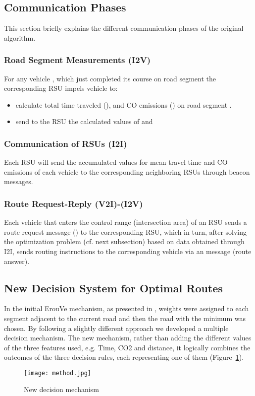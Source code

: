 \documentclass[conference]{IEEEtran}
\begin{document}
\subsection{Communication Phases}
This section briefly explains the different communication phases of the original algorithm. 

\subsubsection{{\bf Road Segment Measurements (I2V)}}
For any vehicle , which just completed its course on road segment   the corresponding RSU impels vehicle  to:

\begin{itemize}
\item calculate total time traveled (), and CO emissions () on road segment . \item send to the RSU the calculated values of   and 
\end{itemize}


\subsubsection{{\bf Communication of RSUs (I2I)}}
Each RSU will send the accumulated values for mean travel time and CO emissions of each vehicle to the corresponding neighboring RSUs through beacon messages.


\subsubsection{{\bf Route Request-Reply (V2I)-(I2V)}}
Each vehicle  that enters the control range (intersection area) of an RSU sends a route request message () to the corresponding RSU,
which in turn, after solving the optimization problem (cf. next subsection) based on data obtained through I2I,  sends routing instructions
 to the corresponding vehicle via an  message  (route answer).


\subsection{New Decision System for Optimal Routes}
In the initial ErouVe mechanism, as presented in \cite{maglaras2013exploiting}, weights were assigned to each segment adjacent to the current road and then 
the road with the minimum was chosen.
By following  a slightly different approach we developed a multiple decision mechanism. The new mechanism, rather than adding the different values of the three features used, e.g. Time, CO2 and distance, it logically combines the outcomes of the three decision rules, each representing one of them (Figure~\ref{dec-syst}). 
\begin{figure}[!htb]
  \centering
 \texttt{[image: method.jpg]}	
  \caption{New decision mechanism}
  \label{dec-syst}
\end{figure}
\end{document}
